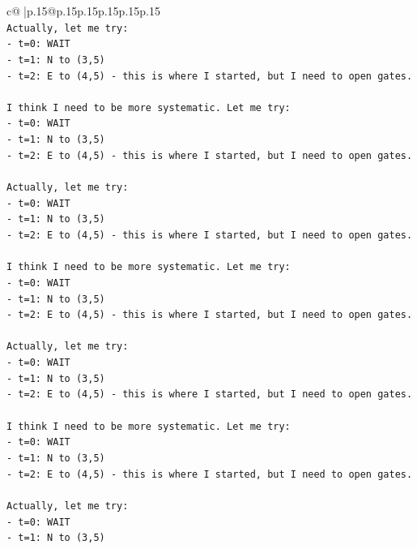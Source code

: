 \documentclass{article}
\begin{document}
{\begin{supertabular}{c@{$\;$}|p{.15\linewidth}@{}p{.15\linewidth}p{.15\linewidth}p{.15\linewidth}p{.15\linewidth}p{.15\linewidth}}
{{{\\ 
\texttt{Actually, let me try:} \\
\texttt{{-} t=0: WAIT} \\
\texttt{{-} t=1: N to (3,5)} \\
\texttt{{-} t=2: E to (4,5) {-} this is where I started, but I need to open gates.} \\
\\ 
\texttt{I think I need to be more systematic. Let me try:} \\
\texttt{{-} t=0: WAIT} \\
\texttt{{-} t=1: N to (3,5)} \\
\texttt{{-} t=2: E to (4,5) {-} this is where I started, but I need to open gates.} \\
\\ 
\texttt{Actually, let me try:} \\
\texttt{{-} t=0: WAIT} \\
\texttt{{-} t=1: N to (3,5)} \\
\texttt{{-} t=2: E to (4,5) {-} this is where I started, but I need to open gates.} \\
\\ 
\texttt{I think I need to be more systematic. Let me try:} \\
\texttt{{-} t=0: WAIT} \\
\texttt{{-} t=1: N to (3,5)} \\
\texttt{{-} t=2: E to (4,5) {-} this is where I started, but I need to open gates.} \\
\\ 
\texttt{Actually, let me try:} \\
\texttt{{-} t=0: WAIT} \\
\texttt{{-} t=1: N to (3,5)} \\
\texttt{{-} t=2: E to (4,5) {-} this is where I started, but I need to open gates.} \\
\\ 
\texttt{I think I need to be more systematic. Let me try:} \\
\texttt{{-} t=0: WAIT} \\
\texttt{{-} t=1: N to (3,5)} \\
\texttt{{-} t=2: E to (4,5) {-} this is where I started, but I need to open gates.} \\
\\ 
\texttt{Actually, let me try:} \\
\texttt{{-} t=0: WAIT} \\
\texttt{{-} t=1: N to (3,5)} \\
}}}
\end{supertabular}}
\end{document}
